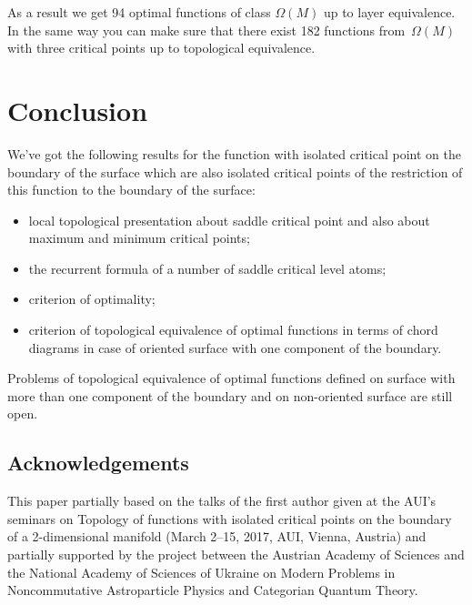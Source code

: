 \documentclass[pdftex]{sigma}
\numberwithin{equation}{section}
\begin{document}
As a result we get 94 optimal functions of class $\Omega(M)$ up to layer equivalence. In the same way you can make sure that there exist 182 functions from~$\Omega(M)$ with three critical points up to topological equivalence.

\section{Conclusion}

We've got the following results for the function with isolated critical point on the boundary of the surface which are also isolated critical points of the restriction of this function to the boundary of the surface:
\begin{itemize}\itemsep=0pt
\item local topological presentation about saddle critical point and also about maximum and minimum critical points;
\item the recurrent formula of a number of saddle critical level atoms;
\item criterion of optimality;
\item criterion of topological equivalence of optimal functions in terms of chord diagrams in case of oriented surface with one component of the boundary.
\end{itemize}

Problems of topological equivalence of optimal functions def\/ined on surface with more than one component of the boundary and on non-oriented surface are still open.

\subsection*{Acknowledgements}
This paper partially based on the talks of the f\/irst author given at the AUI's seminars on Topology of functions with isolated critical points on the boundary of a 2-dimensional manifold (March 2--15, 2017, AUI, Vienna, Austria) and partially supported by the project between the Austrian Academy of Sciences and the National Academy of Sciences of Ukraine on Modern Problems in Noncommutative Astroparticle Physics and Categorian Quantum Theory.
\end{document}

